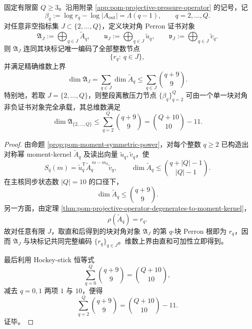 \begin{theorem}[有限矩阶相图的单证书编译]\label{thm:conclusion-finite-moment-order-phase-diagram-single-certificate-compilation}
固定有限窗 \(Q\ge 3\)。沿用附录 \ref{app:pom-projective-pressure-operator} 的记号，记
\[
\beta_q:=\log r_q-\log |A_{\mathrm{out}}|=\Lambda(q-1),
\qquad
q=2,\dots,Q.
\]
对任意非空指标集 \(J\subset\{2,\dots,Q\}\)，定义块对角 Perron 证书对象
\[
\mathfrak A_J:=\bigoplus_{q\in J}\widetilde A_q,
\qquad
\mathfrak u_J:=\bigoplus_{q\in J}\widetilde u_q,
\qquad
\mathfrak v_J:=\bigoplus_{q\in J}\widetilde v_q.
\]
则 \(\mathfrak A_J\) 连同其块标记唯一编码了全部整数节点
\[
\{r_q:\ q\in J\},
\]
并满足精确维数上界
\[
\dim \mathfrak A_J
=
\sum_{q\in J}\dim \widetilde A_q
\le
\sum_{q\in J}\binom{q+9}{9}.
\]
特别地，若取 \(J=\{2,\dots,Q\}\)，则整段离散压力节点 \(\{\beta_q\}_{q=2}^{Q}\) 可由一个单一块对角非负证书对象完全承载，其总维数满足
\[
\dim \mathfrak A_{\{2,\dots,Q\}}
\le
\sum_{q=2}^{Q}\binom{q+9}{9}
=
\binom{Q+10}{10}-11.
\]
\end{theorem}
\begin{proof}
由命题 \ref{prop:pom-moment-symmetric-power}，对每个整数 \(q\ge 2\) 已构造出对称幂 moment-kernel \(\widetilde A_q\) 及读出向量 \(\widetilde u_q,\widetilde v_q\)，使
\[
S_q(m)=\widetilde u_q^{\mathsf T}\widetilde A_q^{\,m-m_0}\widetilde v_q,
\qquad
\dim \widetilde A_q\le \binom{q+|Q|-1}{|Q|-1}.
\]
在主核同步状态数 \(|Q|=10\) 的口径下，
\[
\dim \widetilde A_q\le \binom{q+9}{9}.
\]
另一方面，由定理 \ref{thm:pom-projective-operator-degenerates-to-moment-kernel}，
\[
\rho(\widetilde A_q)=r_q.
\]
故对任意有限 \(J\)，取直和后得到的块对角对象 \(\mathfrak A_J\) 的第 \(q\)-块 Perron 根即为 \(r_q\)，因而 \(\mathfrak A_J\) 与块标记共同完整编码 \(\{r_q\}_{q\in J}\)。维数上界由直和可加性立即得到。

最后利用 Hockey-stick 恒等式
\[
\sum_{q=0}^{Q}\binom{q+9}{9}=\binom{Q+10}{10},
\]
减去 \(q=0,1\) 两项 \(1\) 与 \(10\)，便得
\[
\sum_{q=2}^{Q}\binom{q+9}{9}=\binom{Q+10}{10}-11.
\]
证毕。
\end{proof}

